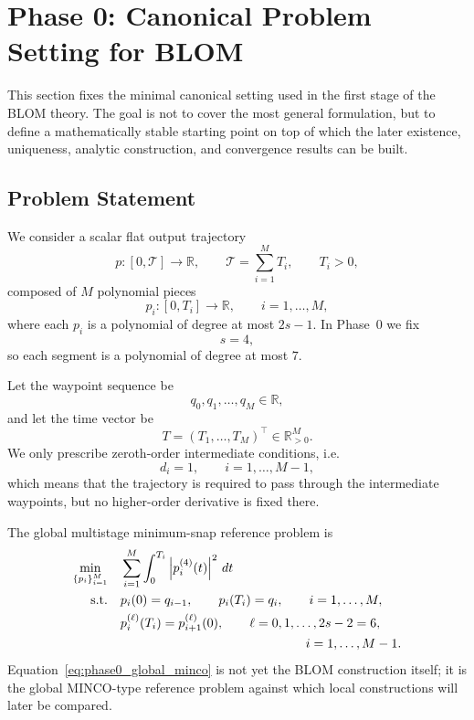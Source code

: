 \section{Phase 0: Canonical Problem Setting for BLOM}
\label{sec:blom_phase0}

This section fixes the minimal canonical setting used in the first stage of the BLOM theory.
The goal is not to cover the most general formulation, but to define a mathematically stable starting point on top of which the later existence, uniqueness, analytic construction, and convergence results can be built.

\subsection{Problem Statement}
\label{subsec:phase0_problem}

We consider a scalar flat output trajectory
\[
p:[0,\mathcal T] \to \mathbb R,
\qquad
\mathcal T = \sum_{i=1}^{M} T_i,
\qquad T_i > 0,
\]
composed of $M$ polynomial pieces
\[
p_i:[0,T_i] \to \mathbb R,
\qquad i=1,\dots,M,
\]
where each $p_i$ is a polynomial of degree at most $2s-1$.
In Phase~0 we fix
\[
s = 4,
\]
so each segment is a polynomial of degree at most $7$.

Let the waypoint sequence be
\[
q_0,q_1,\dots,q_M \in \mathbb R,
\]
and let the time vector be
\[
T=(T_1,\dots,T_M)^\top \in \mathbb R_{>0}^{M}.
\]
We only prescribe zeroth-order intermediate conditions, i.e.
\[
d_i = 1,
\qquad i=1,\dots,M-1,
\]
which means that the trajectory is required to pass through the intermediate waypoints, but no higher-order derivative is fixed there.

The global multistage minimum-snap reference problem is
\begin{equation}
\label{eq:phase0_global_minco}
\begin{aligned}
\min_{\{p_i\}_{i=1}^{M}} \quad &
\sum_{i=1}^{M} \int_0^{T_i} \left| p_i^{(4)}(t) \right|^2 \, dt \\
\text{s.t.} \quad
& p_i(0)=q_{i-1}, \qquad p_i(T_i)=q_i, \qquad i=1,\dots,M, \\
& p_i^{(\ell)}(T_i)=p_{i+1}^{(\ell)}(0), \qquad \ell=0,1,\dots,2s-2=6, \\
& \hspace{5.1cm} i=1,\dots,M-1.
\end{aligned}
\end{equation}
Equation~\eqref{eq:phase0_global_minco} is not yet the BLOM construction itself; it is the global MINCO-type reference problem against which local constructions will later be compared.

